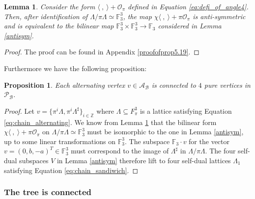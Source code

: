 \documentclass{eptcs}
\newtheorem{lemma}[theorem]{Lemma}
\newtheorem{proposition}[theorem]{Proposition}
\theoremstyle{remark}
\theoremstyle{definition}
\newcommand{\dual}[1]{{#1}^{\sharp}}
\begin{document}
\begin{lemma}
  \label{le:nondegen2}
  Consider the form $\langle \ , \ \rangle + \mathcal{O}_{\pi}$ defined in 
  Equation \ref{eq:defi_of_angle4}. Then, after identification of $\Lambda / \pi \Lambda \simeq \mathbb{F}_{3}^{3}$, the map $\chi \langle \ , \ \rangle + \pi \mathcal{O}_{\pi}$ is anti-symmetric and is equivalent to the bilinear map $\mathbb{F}_{3}^{3} \times \mathbb{F}_{3}^{3} \rightarrow  \mathbb{F}_{3}$ considered in Lemma \ref{antisym}.
\end{lemma}
\begin{proof}
The proof can be found in Appendix \ref{proofofprop5.19}.
\end{proof}
Furthermore we have the following proposition:
\begin{proposition}
    \label{pr:alternatings_has_pure_neighbours}
    Each alternating vertex $v \in \mathcal{A}_{\mathcal{B}}$ is connected to $4$ pure vertices in $\mathcal{P}_{\mathcal{B}}$.
\end{proposition}
\begin{proof}

Let $v = \{ \pi^{i}\Lambda, \pi^{i} \dual{\Lambda}\}_{i \in \mathbb{Z}}$ where $\Lambda \subseteq F_{\pi}^{3}$ is a lattice satisfying Equation \ref{eq:chain_alternating}. We know from Lemma \ref{le:nondegen2} that the bilinear form $\chi \langle \ , \ \rangle + \pi \mathcal{O}_{\pi}$ on $\Lambda/\pi \Lambda \simeq \mathbb{F}_{3}^{3}$ must be isomorphic to the one in Lemma \ref{antisym}, up to some linear transformations on $\mathbb{F}_{3}^3$. The subspace $\mathbb{F}_{3} \cdot v $ for the vector $v= (0,b,-a)^{T} \in \mathbb{F}_{3}^{3}$ must correspond to the image of $\dual{\Lambda}$ in $\Lambda/\pi \Lambda$. The four self-dual subspaces $V$ in Lemma \ref{antisym} therefore lift to four self-dual lattices $\Lambda_{1}$ satisfying Equation \ref{eq:chain_sandiwich}.


\end{proof}

\subsubsection{The tree is connected}
\end{document}
